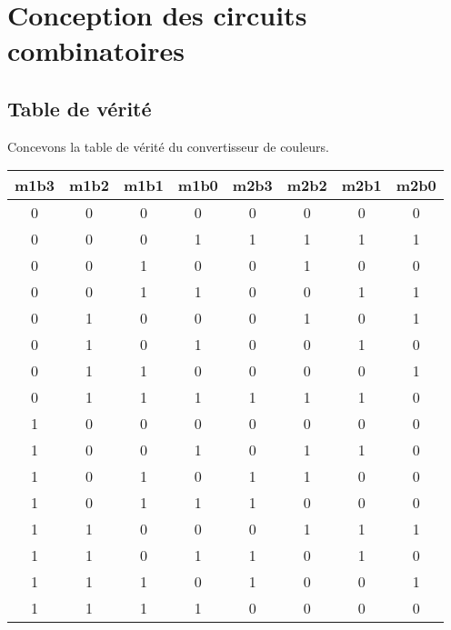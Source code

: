 \documentclass[12pt]{article}
\begin{document}



\section{Conception des circuits combinatoires}
\subsection{Table de vérité}
Concevons la table de vérité du convertisseur de couleurs.
\singlespacing
\begin{center}
	\begin{tabular}{|c|c|c|c||c|c|c|c|}
		\hline
		m1b3 & m1b2 & m1b1 & m1b0 & m2b3 & m2b2 & m2b1 & m2b0 \\ \hline
		0    & 0    & 0    & 0    & 0    & 0    & 0    & 0    \\ \hline
		0    & 0    & 0    & 1    & 1    & 1    & 1    & 1    \\ \hline
		0    & 0    & 1    & 0    & 0    & 1    & 0    & 0    \\ \hline
		0    & 0    & 1    & 1    & 0    & 0    & 1    & 1    \\ \hline
		0    & 1    & 0    & 0    & 0    & 1    & 0    & 1    \\ \hline
		0    & 1    & 0    & 1    & 0    & 0    & 1    & 0    \\ \hline
		0    & 1    & 1    & 0    & 0    & 0    & 0    & 1    \\ \hline
		0    & 1    & 1    & 1    & 1    & 1    & 1    & 0    \\ \hline
		1    & 0    & 0    & 0    & 0    & 0    & 0    & 0    \\ \hline
		1    & 0    & 0    & 1    & 0    & 1    & 1    & 0    \\ \hline
		1    & 0    & 1    & 0    & 1    & 1    & 0    & 0    \\ \hline
		1    & 0    & 1    & 1    & 1    & 0    & 0    & 0    \\ \hline
		1    & 1    & 0    & 0    & 0    & 1    & 1    & 1    \\ \hline
		1    & 1    & 0    & 1    & 1    & 0    & 1    & 0    \\ \hline
		1    & 1    & 1    & 0    & 1    & 0    & 0    & 1    \\ \hline
		1    & 1    & 1    & 1    & 0    & 0    & 0    & 0    \\ \hline
	\end{tabular}
\end{center}
\doublespacing
\end{document}

